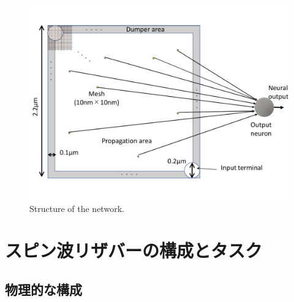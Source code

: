 \documentclass[a4j, twocolumn]{jsarticle}
\begin{document}
\begin{figure}
\centering
\includegraphics[width=0.9\hsize]{./figures/selected_neuron_structure.pdf} 
\caption{Structure of the network.}
\label{fig:sond}
\end{figure}

\section{スピン波リザバーの構成とタスク}%
\label{sec:constandtask}

\subsection{物理的な構成}
\label{subsec:const}
\end{document}
